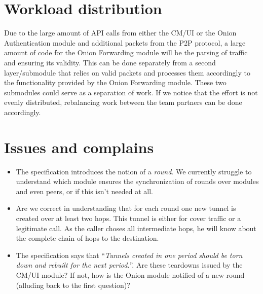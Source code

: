\documentclass[paper=letter, fontsize=12pt]{article}
\begin{document}
\section{Workload distribution}
Due to the large amount of API calls from either the CM/UI or the Onion Authentication module and additional packets from the P2P protocol, a large amount of code for the Onion Forwarding module will be the parsing of traffic and ensuring its validity. This can be done separately from a second layer/submodule that relies on valid packets and processes them accordingly to the functionality provided by the Onion Forwarding module. These two submodules could serve as a separation of work. If we notice that the effort is not evenly distributed, rebalancing work between the team partners can be done accordingly.

\section{Issues and complains}
\begin{itemize}
\item The specification introduces the notion of a \emph{round}. We currently struggle to understand which module ensures the synchronization of rounds over modules and even peers, or if this isn't needed at all.

\item Are we correct in understanding that for each round one new tunnel is created over at least two hops. This tunnel is either for cover traffic or a legitimate call. As the caller choses all intermediate hops, he will know about the complete chain of hops to the destination. 

\item The specification says that \enquote{\emph{Tunnels created in one period should be torn down and rebuilt for the next period.}}. Are these teardowns issued by the CM/UI module? If not, how is the Onion module notified of a new round (alluding back to the first question)?
\end{itemize}

\end{document}
